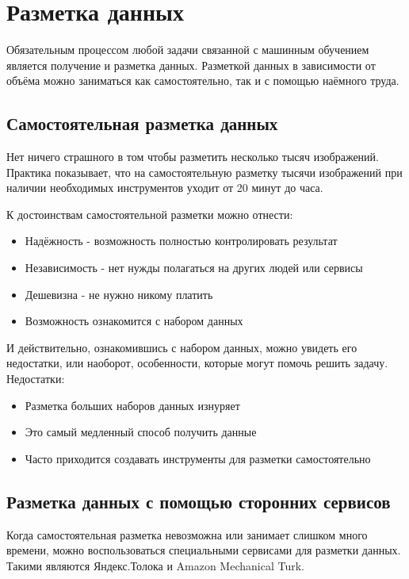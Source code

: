 \section{Разметка данных} \label{sect1_3}
Обязательным процессом любой задачи связанной с машинным обучением является получение и разметка данных. Разметкой данных в зависимости от объёма можно заниматься как самостоятельно, так и с помощью наёмного труда. 

\subsection{Самостоятельная разметка данных} \label{subsect1_3_1}
Нет ничего страшного в том чтобы разметить несколько тысяч изображений. Практика показывает, что на самостоятельную разметку тысячи изображений при наличии необходимых инструментов уходит от 20 минут до часа.

К достоинствам самостоятельной разметки можно отнести:
\begin{itemize}
    \item Надёжность - возможность полностью контролировать результат
    \item Независимость - нет нужды полагаться на других людей или сервисы
    \item Дешевизна - не нужно никому платить
    \item Возможность ознакомится с набором данных
\end{itemize}
И действительно, ознакомившись с набором данных, можно увидеть его недостатки, или наоборот, особенности, которые могут помочь решить задачу.
Недостатки:
\begin{itemize}
    \item Разметка больших наборов данных изнуряет
    \item Это самый медленный способ получить данные
    \item Часто приходится создавать инструменты для разметки самостоятельно
\end{itemize}


\subsection{Разметка данных с помощью сторонних сервисов} \label{subsect1_3_2}
Когда самостоятельная разметка невозможна или занимает слишком много времени, можно воспользоваться специальными сервисами для разметки данных. Такими являются Яндекс.Толока и Amazon Mechanical Turk.

